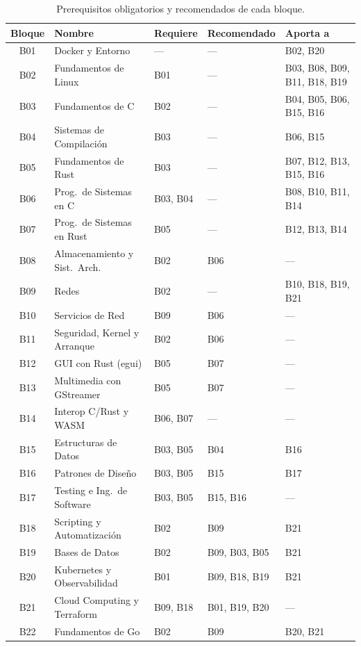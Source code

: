 \documentclass[11pt, letterpaper]{article}
\begin{document}
\begin{table}[H]
\centering
\begin{tabular}{c l l l l}
\toprule
\textbf{Bloque} & \textbf{Nombre} & \textbf{Requiere} & \textbf{Recomendado} & \textbf{Aporta a} \\
\midrule
\rowcolor{tTrack}
B01 & Docker y Entorno & --- & --- & B02, B20 \\
\rowcolor{tTrack}
B02 & Fundamentos de Linux & B01 & --- & B03, B08, B09, B11, B18, B19 \\
\rowcolor{cTrack}
B03 & Fundamentos de C & B02 & --- & B04, B05, B06, B15, B16 \\
\rowcolor{qTrack}
B04 & Sistemas de Compilación & B03 & --- & B06, B15 \\
\rowcolor{rTrack}
B05 & Fundamentos de Rust & B03 & --- & B07, B12, B13, B15, B16 \\
\rowcolor{cTrack}
B06 & Prog.\ de Sistemas en C & B03, B04 & --- & B08, B10, B11, B14 \\
\rowcolor{rTrack}
B07 & Prog.\ de Sistemas en Rust & B05 & --- & B12, B13, B14 \\
\rowcolor{lTrack}
B08 & Almacenamiento y Sist.\ Arch. & B02 & B06 & --- \\
\rowcolor{lTrack}
B09 & Redes & B02 & --- & B10, B18, B19, B21 \\
\rowcolor{lTrack}
B10 & Servicios de Red & B09 & B06 & --- \\
\rowcolor{lTrack}
B11 & Seguridad, Kernel y Arranque & B02 & B06 & --- \\
\rowcolor{rTrack}
B12 & GUI con Rust (egui) & B05 & B07 & --- \\
\rowcolor{rTrack}
B13 & Multimedia con GStreamer & B05 & B07 & --- \\
\rowcolor{tTrack}
B14 & Interop C/Rust y WASM & B06, B07 & --- & --- \\
\rowcolor{tTrack}
B15 & Estructuras de Datos & B03, B05 & B04 & B16 \\
\rowcolor{qTrack}
B16 & Patrones de Diseño & B03, B05 & B15 & B17 \\
\rowcolor{qTrack}
B17 & Testing e Ing.\ de Software & B03, B05 & B15, B16 & --- \\
\rowcolor{dTrack}
B18 & Scripting y Automatización & B02 & B09 & B21 \\
\rowcolor{dTrack}
B19 & Bases de Datos & B02 & B09, B03, B05 & B21 \\
\rowcolor{dTrack}
B20 & Kubernetes y Observabilidad & B01 & B09, B18, B19 & B21 \\
\rowcolor{dTrack}
B21 & Cloud Computing y Terraform & B09, B18 & B01, B19, B20 & --- \\
\rowcolor{goTrack}
B22 & Fundamentos de Go & B02 & B09 & B20, B21 \\
\bottomrule
\end{tabular}
\caption{Prerequisitos obligatorios y recomendados de cada bloque.}
\end{table}
\end{document}
